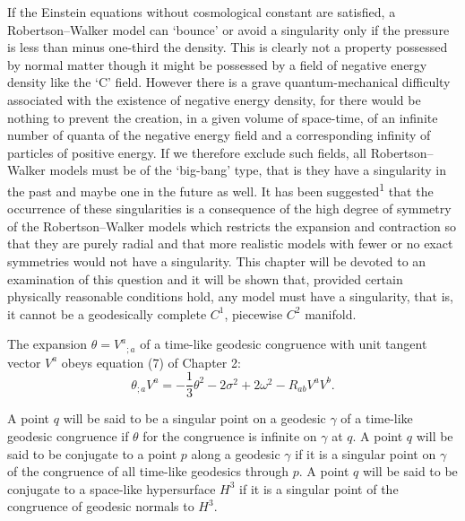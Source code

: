 





If the Einstein equations without cosmological constant are satisfied, a
Robertson--Walker model can `bounce' or avoid a singularity only if the
pressure is less than minus one-third the density. This is clearly not a
property possessed by normal matter though it might be possessed by a field
of negative energy density like the `C' field. However there is a grave
quantum-mechanical difficulty associated with the existence of negative
energy density, for there would be nothing to prevent the creation, in a
given volume of space-time, of an infinite number of quanta of the negative
energy field and a corresponding infinity of particles of positive energy.
If we therefore exclude such fields, all Robertson--Walker models must be of
the `big-bang' type, that is they have a singularity in the past and maybe one
in the future as well. It has been suggested\textsuperscript{1} that the
occurrence of these singularities is a consequence of the high degree of
symmetry of the Robertson--Walker models which restricts the expansion and
contraction so that they are purely radial and that more realistic models
with fewer or no exact symmetries would not have a singularity. This chapter
will be devoted to an examination of this question and it will be shown that,
provided certain physically reasonable conditions hold, any model must have
a singularity, that is, it cannot be a geodesically complete $C^1$, piecewise
$C^2$ manifold.


The expansion $\theta=V^a{}_{;a}$ of a time-like geodesic congruence with unit
tangent vector $V^a$ obeys equation (7) of Chapter 2:
\begin{equation}
\theta_{;a}V^a
=-\frac{1}{3}\theta^2-2\sigma^2+2\omega^2-R_{ab}V^aV^b.
\tag{1}
\end{equation}

A point $q$ will be said to be a singular point on a geodesic $\gamma$ of a
time-like geodesic congruence if $\theta$ for the congruence is infinite on
$\gamma$ at $q$. A point $q$ will be said to be conjugate to a point $p$ along
a geodesic $\gamma$ if it is a singular point on $\gamma$ of the congruence of
all time-like geodesics through $p$. A point $q$ will be said to be conjugate
to a space-like hypersurface $H^3$ if it is a singular point of the congruence
of geodesic normals to $H^3$.


